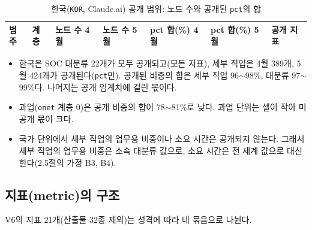 \documentclass[11pt]{article}
\begin{document}
\begin{longtable}{L{2.8cm}L{2.6cm}R{1.6cm}R{1.6cm}R{1.8cm}R{1.8cm}L{3.6cm}}
\caption{한국(\texttt{KOR}, Claude.ai) 공개 범위: 노드 수와 공개된 \texttt{pct}의 합}\label{tab:kor}\\
\toprule
범주 & 계층 & 노드 수 4월 & 노드 수 5월 & pct 합(\%) 4월 & pct 합(\%) 5월 & 공개 지표 \\
\midrule
\endfirsthead

\bottomrule
\end{longtable}

\begin{itemize}[leftmargin=*]
  \item 한국은 SOC 대분류 22개가 모두 공개되고(모든 지표), 세부 직업은 4월 389개, 5월 424개가 공개된다(\texttt{pct}만). 공개된 비중의 합은 세부 직업 96$\sim$98\%, 대분류 97$\sim$99\%다. 나머지는 공개 임계치에 걸린 몫이다.
  \item 과업(\texttt{onet} 계층 0)은 공개 비중의 합이 78$\sim$81\%로 낮다. 과업 단위는 셀이 작아 미공개 몫이 크다.
  \item 국가 단위에서 세부 직업의 업무용 비중이나 소요 시간은 공개되지 않는다. 그래서 세부 직업의 업무용 비중은 소속 대분류 값으로, 소요 시간은 전 세계 값으로 대신한다(2.5절의 가정 B3, B4).
\end{itemize}

\subsection{지표(metric)의 구조}

V6의 지표 21개(산출물 32종 제외)는 성격에 따라 네 묶음으로 나뉜다.
\end{document}
